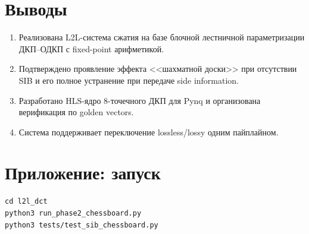 \documentclass[12pt,a4paper]{article}
\begin{document}
\section{Выводы}

\begin{enumerate}
\item Реализована L2L-система сжатия на базе блочной лестничной параметризации ДКП--ОДКП с fixed-point арифметикой.
\item Подтверждено проявление эффекта <<шахматной доски>> при отсутствии SIB и его полное устранение при передаче side information.
\item Разработано HLS-ядро 8-точечного ДКП для Pynq и организована верификация по golden vectors.
\item Система поддерживает переключение lossless/lossy одним пайплайном.
\end{enumerate}

\section*{Приложение: запуск}

\begin{lstlisting}
cd l2l_dct
python3 run_phase2_chessboard.py
python3 tests/test_sib_chessboard.py
\end{lstlisting}
\end{document}
